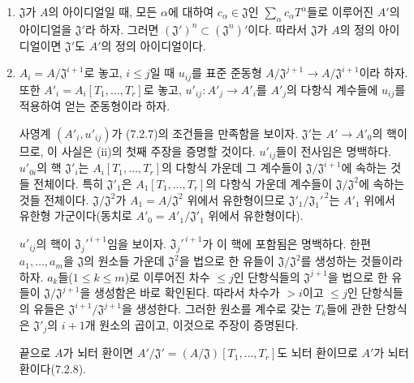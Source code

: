 \begin{enumerate}
  \item[(i)] $\mathfrak J$가 $A$의 아이디얼일 때, 모든
    $\alpha$에 대하여 $c_\alpha\in\mathfrak J$인
    $\sum_\alpha c_\alpha T^\alpha$들로 이루어진 $A'$의
    아이디얼을 $\mathfrak J'$라 하자. 그러면
    $(\mathfrak J')^n\subset(\mathfrak J^n)'$이다. 따라서
    $\mathfrak J$가 $A$의 정의 아이디얼이면 $\mathfrak J'$도
    $A'$의 정의 아이디얼이다.

  \item[(ii)] $A_i=A/\mathfrak J^{i+1}$로 놓고, $i\leq j$일 때
    $u_{ij}$를 표준 준동형
    $A/\mathfrak J^{j+1}\to A/\mathfrak J^{i+1}$이라 하자. 또한
    $A'_i=A_i[T_1,\ldots,T_r]$로 놓고, $u'_{ij}:A'_j\to A'_i$를
    $A'_j$의 다항식 계수들에 $u_{ij}$를 적용하여 얻는 준동형이라
    하자.

    사영계 $(A'_i,u'_{ij})$가 (7.2.7)의 조건들을 만족함을 보이자.
    $\mathfrak J'$는 $A'\to A'_0$의 핵이므로, 이 사실은 (ii)의 첫째
    주장을 증명할 것이다. $u'_{ij}$들이 전사임은 명백하다.
    $u'_{0i}$의 핵 $\mathfrak J'_i$는
    $A_i[T_1,\ldots,T_r]$의 다항식 가운데 그 계수들이
    $\mathfrak J/\mathfrak J^{i+1}$에 속하는 것들 전체이다. 특히
    $\mathfrak J'_1$은 $A_1[T_1,\ldots,T_r]$의 다항식 가운데
    계수들이 $\mathfrak J/\mathfrak J^2$에 속하는 것들 전체이다.
    $\mathfrak J/\mathfrak J^2$가
    $A_1=A/\mathfrak J^2$ 위에서 유한형이므로
    $\mathfrak J'_1/\mathfrak J_1'^{\,2}$는 $A'_1$ 위에서 유한형
    가군이다(동치로 $A'_0=A'_1/\mathfrak J'_1$ 위에서 유한형이다).

    $u'_{ij}$의 핵이 $\mathfrak J_j'^{\,i+1}$임을 보이자.
    $\mathfrak J_j'^{\,i+1}$가 이 핵에 포함됨은 명백하다. 한편
    $a_1,\ldots,a_m$을 $\mathfrak J$의 원소들 가운데
    $\mathfrak J^2$을 법으로 한 유들이
    $\mathfrak J/\mathfrak J^2$를 생성하는 것들이라 하자.
    $a_k$들($1\leq k\leq m$)로 이루어진 차수 $\leq j$인 단항식들의
    $\mathfrak J^{j+1}$을 법으로 한 유들이
    $\mathfrak J/\mathfrak J^{j+1}$을 생성함은 바로 확인된다.
    따라서 차수가 $>i$이고 $\leq j$인 단항식들의 유들은
    $\mathfrak J^{i+1}/\mathfrak J^{j+1}$을 생성한다. 그러한 원소를
    계수로 갖는 $T_k$들에 관한 단항식은
    $\mathfrak J'_j$의 $i+1$개 원소의 곱이고, 이것으로 주장이
    증명된다.

    끝으로 $A$가 뇌터 환이면
    $A'/\mathfrak J'=(A/\mathfrak J)[T_1,\ldots,T_r]$도 뇌터
    환이므로 $A'$가 뇌터 환이다(7.2.8).
\end{enumerate}

